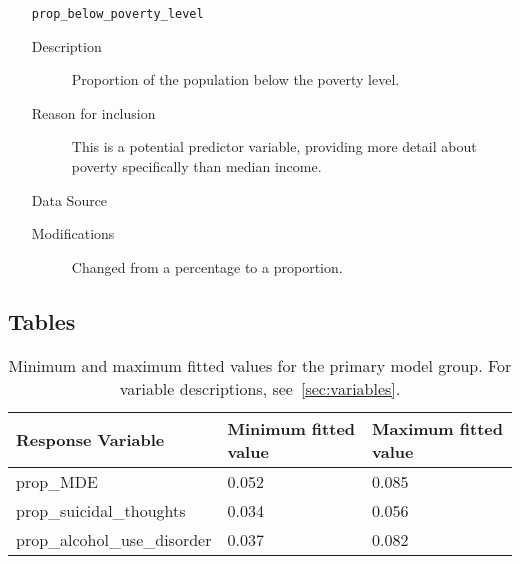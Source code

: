 \documentclass{article}
\begin{document}
\begin{itemize}[label={}, align=left]
\begin{description}
          \end{description}
    \item[\texttt{prop\_below\_poverty\_level}] \
          \begin{description}
              \item[Description] Proportion of the population below the poverty level.
              \item[Reason for inclusion] This is a potential predictor
                    variable, providing more detail about poverty specifically
                    than median income.
              \item[Data Source] \cite{acs_poverty_data}
              \item[Modifications] Changed from a percentage to a proportion.
          \end{description}
\end{itemize}

\pagebreak

\subsection{Tables}

\begin{table}[!htb]
\begin{center}
\begin{tabular}{l l l}
    \hline
    Response Variable & Minimum fitted value & Maximum fitted value\\
    \hline
    prop\_MDE & 0.052 & 0.085\\
    prop\_suicidal\_thoughts & 0.034 & 0.056\\
    prop\_alcohol\_use\_disorder & 0.037 & 0.082\\
    \hline
\end{tabular}
\end{center}
\caption{\label{tab:fitted} Minimum and maximum fitted values
    for the primary model group. For variable descriptions,
    see~\ref{sec:variables}.
}
\end{table}

\pagebreak

\printbibliography
\end{document}
